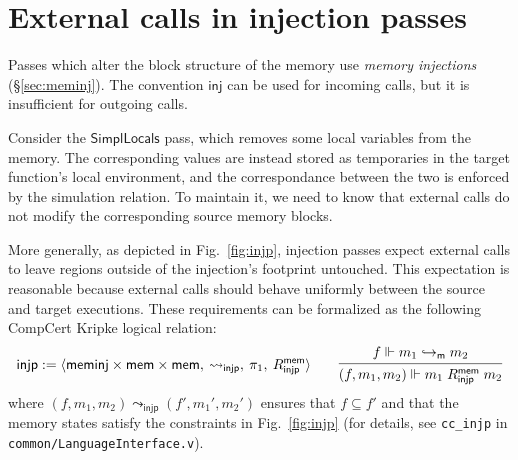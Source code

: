 \documentclass[draft,11pt]{report}
\newcommand{\kw}[1]{\ensuremath{ \mathsf{#1} }}
\begin{document}

\section{External calls in injection passes} \label{sec:injp} %

Passes which alter the block structure of the memory
use \emph{memory injections} (\S\ref{sec:meminj}).
The convention \kw{inj} can be used for incoming calls,
but it is insufficient for outgoing calls.

Consider the \kw{SimplLocals} pass,
which removes some local variables %
from the memory.
The corresponding values are instead stored
as temporaries in the target function's local environment,
and the correspondance between the two
is enforced by the simulation relation.
To maintain it,
we need to know that
external calls do not modify
the corresponding source memory blocks.

More generally,
as depicted in Fig.~\ref{fig:injp},
injection passes expect external calls
to leave regions outside of the injection's footprint untouched.
This expectation is reasonable because
external calls
should behave uniformly between the source and target executions.
These requirements can be formalized as the
following CompCert Kripke logical relation:
\[
  \kw{injp} :=
    \langle
      \kw{meminj} \times \kw{mem} \times \kw{mem}, \:
      {\leadsto_\kw{injp}}, \:
      \pi_1, \:
      R^\kw{mem}_\kw{injp}
    \rangle
  \qquad
  \begin{prooftree}
    \hypo{f \Vdash m_1 \hookrightarrow_\kw{m} m_2}
    \infer1{(f, m_1, m_2) \Vdash m_1 \mathrel{R^\kw{mem}_\kw{injp}} m_2}
  \end{prooftree}
\]
where $(f, m_1, m_2) \leadsto_\kw{injp} (f', m_1', m_2')$
ensures that $f \subseteq f'$ and that the memory states
satisfy the constraints in Fig.~\ref{fig:injp}
(for details,
see \texttt{cc\_injp} in \texttt{common/LanguageInterface.v}).
\end{document}
